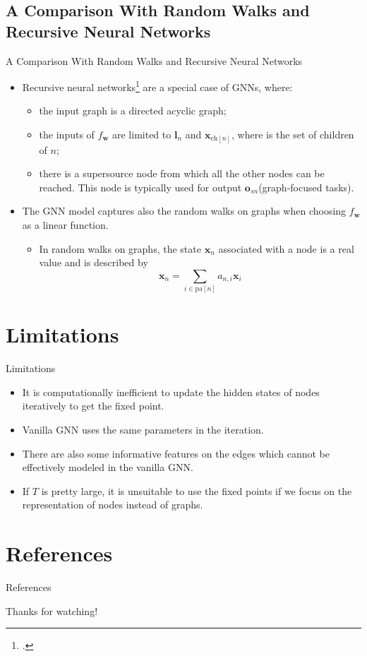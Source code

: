 \documentclass[10pt,aspectratio=169]{beamer}
\begin{document}
\subsection{A Comparison With Random Walks and Recursive Neural Networks}
\begin{frame}{A Comparison With Random Walks and Recursive Neural Networks}
\begin{itemize}
    \item Recursive neural networks\footcite{frasconi1998general} are a special case of GNNs, where:
    \begin{itemize}
        \item the input graph is a directed acyclic graph;
        \item the inputs of $f_{\boldsymbol{w}}$ are limited to $\boldsymbol{l}_n$ and $\boldsymbol{x}_{\text{ch}[n]}$, where is the set of children of $n$;
        \item there is a supersource node from which all the other nodes can be reached. This node is typically used for output $\boldsymbol{o}_{sn}$(graph-focused tasks).
    \end{itemize}\pause
    \item The GNN model captures also the random walks on graphs when choosing $f_{\boldsymbol{w}}$ as a linear function.
    \begin{itemize}
        \item In random walks on graphs, the state $\boldsymbol{x}_n$ associated with a node is a real value and is described by
        $$
        \boldsymbol{x}_n = \sum_{i \in \text{pa}[n]} a_{n, i}\boldsymbol{x}_i
        $$
    \end{itemize}
\end{itemize}


\end{frame}

\section{Limitations}
\begin{frame}{Limitations}
\begin{itemize}
    \item It is computationally inefficient to update the hidden states of nodes iteratively to get the fixed point.
    \item Vanilla GNN uses the same parameters in the iteration.
    \item There are also some informative features on the edges which cannot be effectively modeled in the vanilla GNN.
    \item If $T$ is pretty large, it is unsuitable to use the fixed points if we focus on the representation of nodes instead of graphs.
\end{itemize}
\end{frame}

\section*{References}
\begin{frame}{References}
	\printbibliography
\end{frame}

\begin{frame}
    \begin{center}
        \Huge{Thanks for watching!}
    \end{center}
\end{frame}
\end{document}
